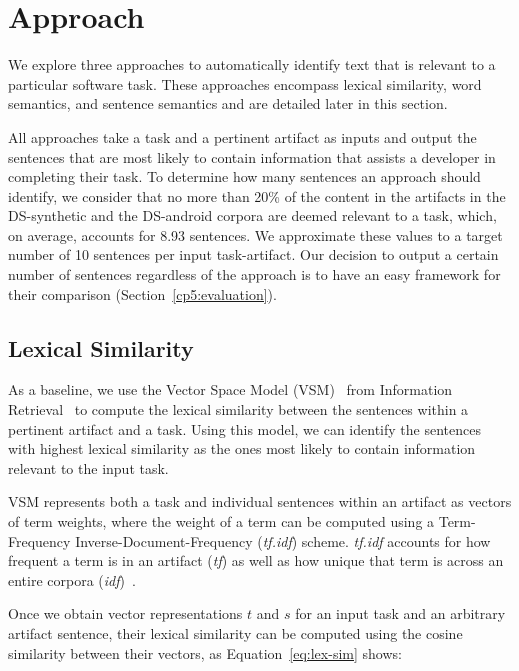 \section{Approach}
\label{cp5:approaches}


We explore three approaches to automatically identify text that is relevant to a particular software task.
These approaches encompass lexical similarity, word semantics, and sentence semantics and are detailed later in this section.



All approaches take a task and a pertinent artifact as inputs and output the sentences 
that are most likely to contain information that assists a developer in completing their task. 
To determine how many sentences an approach should identify, we consider that 
no more than 20\% of the content in the artifacts in the
 \acs{DS-synthetic} and the \acs{DS-android} corpora are deemed relevant to a task, which, on average, accounts for 8.93 sentences. 
We approximate these values to a target number of 10 sentences per input task-artifact. 
Our decision to output a certain number of sentences regardless of the approach is to have an easy framework for their comparison (Section~\ref{cp5:evaluation}).



\subsection{Lexical Similarity}

As a baseline, we use the Vector Space Model (VSM)~\cite{Salton1975vsm} from Information Retrieval~\cite{Manning2009IR}
to compute the lexical similarity between the sentences within a pertinent artifact and a task. 
Using this model, we can identify the sentences with highest lexical similarity 
as the ones most likely to contain information relevant to the input task.




VSM represents both a task and individual sentences within an artifact as vectors of term weights,
where the weight of a term
can be computed using a Term-Frequency Inverse-Document-Frequency (\textit{tf.idf}) scheme.
\textit{tf.idf} accounts for how frequent a term is in an artifact (\textit{tf}) as well as how 
unique that term is across an entire corpora (\textit{idf})~\cite{Manning2009IR}. 


Once we obtain vector representations $t$ and $s$ 
for an input task and an arbitrary artifact sentence, 
their lexical similarity can be computed 
using the cosine similarity between their vectors, as Equation~\ref{eq:lex-sim} shows:



